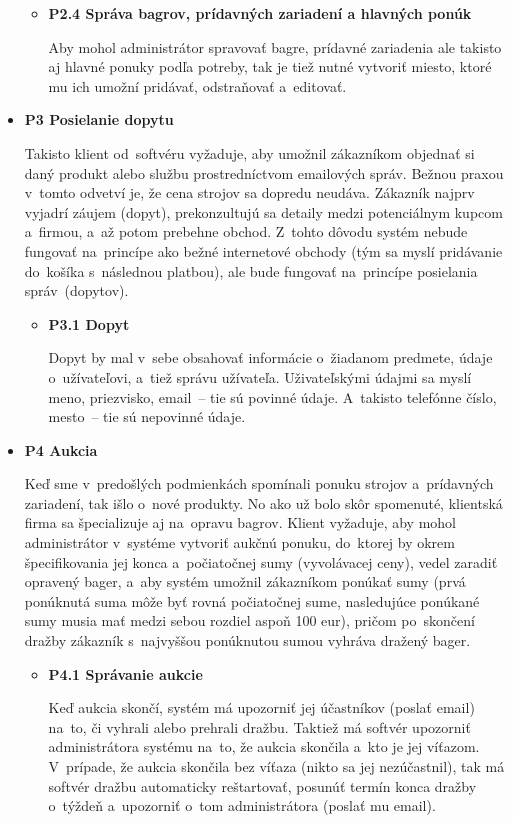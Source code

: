 \begin{itemize}
\begin{itemize}
\item \textbf{P2.4 Správa bagrov, prídavných zariadení a hlavných ponúk}

Aby mohol administrátor spravovať bagre, prídavné zariadenia ale takisto aj hlavné ponuky podľa potreby, tak je tiež nutné vytvoriť miesto, ktoré mu ich umožní pridávať, odstraňovať a~editovať.
\end{itemize}

\item \textbf{P3 Posielanie dopytu}

Takisto klient od~softvéru vyžaduje, aby umožnil zákazníkom objednať si daný produkt alebo službu prostredníctvom emailových správ. Bežnou praxou v~tomto odvetví je, že cena strojov sa dopredu neudáva. Zákazník najprv vyjadrí záujem (dopyt), prekonzultujú sa detaily medzi potenciálnym kupcom a~firmou, a~až potom prebehne obchod. Z~tohto dôvodu systém nebude fungovať na~princípe ako bežné internetové obchody (tým sa myslí pridávanie do~košíka s~následnou platbou), ale bude fungovať na~princípe posielania správ~(dopytov).

\begin{itemize}
\item \textbf{P3.1 Dopyt}

Dopyt by mal v~sebe obsahovať informácie o~žiadanom predmete, údaje o~užívateľovi, a~tiež správu užívateľa. Uživateľskými údajmi sa myslí meno, priezvisko, email~-- tie sú povinné údaje. A~takisto telefónne číslo, mesto~-- tie sú nepovinné údaje.
\end{itemize}

\item \textbf{P4 Aukcia}

Keď sme v~predošlých podmienkách spomínali ponuku strojov a~prídavných zariadení, tak išlo o~nové produkty. No ako už bolo skôr spomenuté, klientská firma sa špecializuje aj na~opravu bagrov. Klient vyžaduje, aby mohol administrátor v~systéme vytvoriť aukčnú ponuku, do~ktorej by okrem špecifikovania jej konca a~počiatočnej sumy (vyvolávacej ceny), vedel zaradiť opravený bager, a~aby systém umožnil zákazníkom ponúkať sumy (prvá ponúknutá suma môže byť rovná počiatočnej sume, nasledujúce ponúkané sumy musia mať medzi sebou rozdiel aspoň 100 eur), pričom po~skončení dražby zákazník s~najvyššou ponúknutou sumou vyhráva dražený bager.

\begin{itemize}
\item \textbf{P4.1 Správanie aukcie}

Keď aukcia skončí, systém má upozorniť jej účastníkov (poslať email) na~to, či vyhrali alebo prehrali dražbu. Taktiež má softvér upozorniť administrátora systému na~to, že aukcia skončila a~kto je jej víťazom. V~prípade, že aukcia skončila bez víťaza (nikto sa jej nezúčastnil), tak má softvér dražbu automaticky reštartovať, posunúť termín konca dražby o~týždeň a~upozorniť o~tom administrátora (poslať mu email).


\end{itemize}
\end{itemize}
